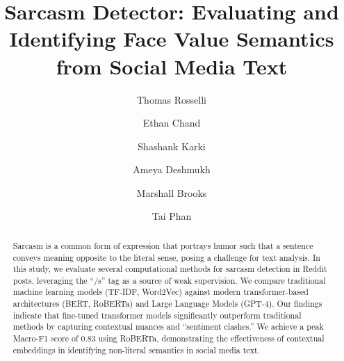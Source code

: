 \documentclass[sigconf]{acmart}
\begin{document}
\title{Sarcasm Detector: Evaluating and Identifying Face Value Semantics from Social Media Text}

\author{Thomas Rosselli}

\author{Ethan Chand}

\author{Shashank Karki}

\author{Ameya Deshmukh}

\author{Marshall Brooks}

\author{Tai Phan}

\renewcommand{\shortauthors}{Rosselli et al.}

\begin{abstract}
Sarcasm is a common form of expression that portrays humor such that a sentence conveys meaning opposite to the literal sense, posing a challenge for text analysis. In this study, we evaluate several computational methods for sarcasm detection in Reddit posts, leveraging the ``/s'' tag as a source of weak supervision. We compare traditional machine learning models (TF-IDF, Word2Vec) against modern transformer-based architectures (BERT, RoBERTa) and Large Language Models (GPT-4). Our findings indicate that fine-tuned transformer models significantly outperform traditional methods by capturing contextual nuances and ``sentiment clashes.'' We achieve a peak Macro-F1 score of 0.83 using RoBERTa, demonstrating the effectiveness of contextual embeddings in identifying non-literal semantics in social media text.
\end{abstract}


\maketitle
\end{document}
